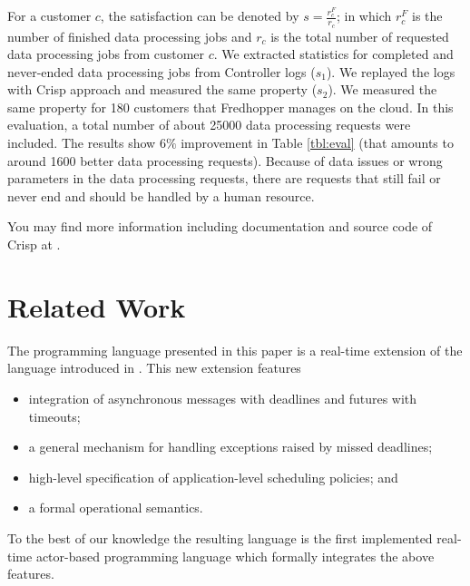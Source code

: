 For a customer $c$, the satisfaction can be denoted by $s = \frac{r^F_c}{r_c}$; in which $r^F_c$ is the number of finished data processing jobs and $r_c$ is the total number of requested data processing jobs from customer $c$. 
We extracted statistics for completed and never-ended data processing jobs from Controller logs ($s_1$).
We replayed the logs with Crisp approach and measured the same property ($s_2$).
We measured the same property for 180 customers that Fredhopper manages on the cloud.
In this evaluation, a total number of about 25000 data processing requests were included.
The results show $6\%$ improvement in Table \ref{tbl:eval} (that amounts to around 1600 better data processing requests). 
Because of data issues or wrong parameters in the data processing requests, there are requests that still fail or never end and should be handled by a human resource.

You may find more information including documentation and source code of Crisp at .

\section{Related Work} \label{sec:relwork}
The programming language presented in this paper is a real-time  extension of the  language introduced in  \cite{crisp-sac}. This new extension features
\begin{itemize}
 \item integration of  asynchronous messages with  deadlines and futures with timeouts;
 \item  a general mechanism for handling exceptions raised by missed deadlines;
  \item high-level specification of application-level scheduling policies; and
  \item a formal operational semantics.
\end{itemize}
To the best of our knowledge the resulting language is the first implemented 
real-time actor-based programming language which formally integrates the above features.

